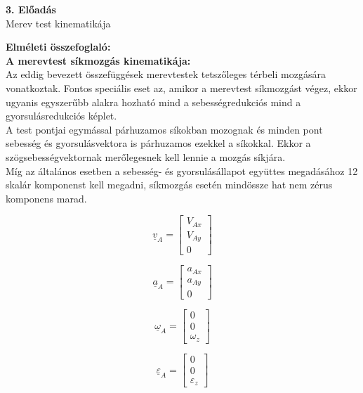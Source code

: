 \begin{center}
    \large \textbf{3. Előadás}\\
    Merev test kinematikája
\end{center}
\textbf{Elméleti összefoglaló:}\\
\textbf{A merevtest síkmozgás kinematikája:}\\
Az eddig bevezett összefüggések merevtestek tetszőleges térbeli mozgására vonatkoztak. Fontos speciális eset az, amikor a merevtest síkmozgást végez, ekkor ugyanis egyszerűbb alakra hozható mind a sebességredukciós mind a gyorsulásredukciós képlet.\\
A test pontjai egymással párhuzamos síkokban mozognak és minden pont sebesség és gyorsulásvektora is párhuzamos ezekkel a síkokkal. Ekkor a szögsebességvektornak merőlegesnek kell lennie a mozgás síkjára.\\
Míg az általános esetben a sebesség- és gyorsulásállapot együttes megadásához 12 skalár komponenst kell megadni, síkmozgás esetén mindössze hat nem zérus komponens marad.
\begin{multicols}{4}
    $$\underline{v}_A = 
    \begin{bmatrix}
        V_{Ax} \\
        V_{Ay} \\
        0
    \end{bmatrix}
    $$

   \columnbreak

   $$\underline{a}_A = 
    \begin{bmatrix}
        a_{Ax} \\
        a_{Ay} \\
        0
    \end{bmatrix}
    $$

    \columnbreak

    $$\underline{\omega}_A = 
    \begin{bmatrix}
        0 \\
        0 \\
        \omega_z
    \end{bmatrix}
    $$

    \columnbreak

    $$\underline{\varepsilon }_A = 
    \begin{bmatrix}
        0 \\
        0 \\
        \varepsilon_z
    \end{bmatrix}
    $$


    
\end{multicols}

